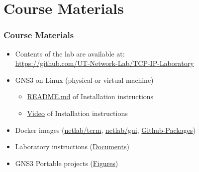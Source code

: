 \documentclass[aspectratio=169,15pt]{beamer}
\begin{document}
\section{Course Materials}
\begin{frame}
    \frametitle{Course Materials}

    \begin{itemize}
        \item Contents of the lab are available at:\\
         \url{https://github.com/UT-Network-Lab/TCP-IP-Laboratory}
        \item GNS3 on Linux (physical or virtual machine)
        \begin{itemize}
            \item \href{https://github.com/UT-Network-Lab/TCP-IP-Laboratory/blob/master/README.md}{README.md} of Installation instructions
            \item \href{https://www.dropbox.com/s/bad8eongryfnylr/GNS3\%20Installation\%20Tutorial.mp4?dl=0}{Video} of Installation instructions
        \end{itemize}
        \item Docker images (\href{https://hub.docker.com/r/utnetlab/term}{netlab/term}, \href{https://hub.docker.com/r/utnetlab/gui}{netlab/gui}, \href{https://github.com/orgs/UT-Network-Lab/packages?repo_name=docker-tools}{Github-Packages})
        \item Laboratory instructions (\href{https://github.com/UT-Network-Lab/TCP-IP-Laboratory/releases/latest}{Documents})
        \item GNS3 Portable projects (\href{https://github.com/UT-Network-Lab/gns3-figures/releases/latest}{Figures})
    \end{itemize}

\end{frame}
\end{document}

